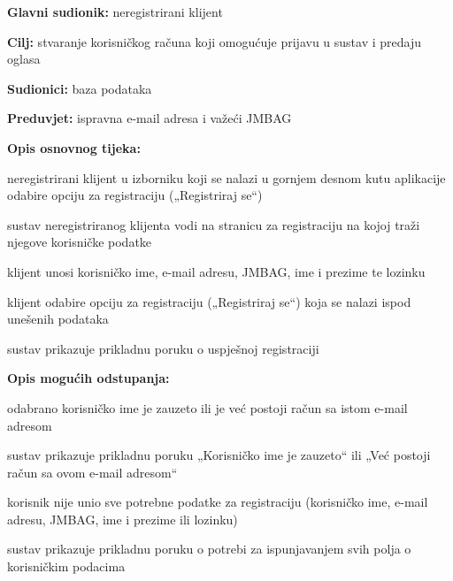 \noindent {}
\begin{packed_item}
	
	\item \textbf{Glavni sudionik: } neregistrirani klijent
	\item  \textbf{Cilj:} stvaranje korisničkog računa koji omogućuje prijavu u sustav i predaju oglasa
	\item  \textbf{Sudionici:} baza podataka
	\item  \textbf{Preduvjet:} ispravna e-mail adresa i važeći JMBAG
	\item  \textbf{Opis osnovnog tijeka:}
	
	\item[] \begin{packed_enum}
		
		\item neregistrirani klijent u izborniku koji se nalazi u gornjem desnom kutu aplikacije odabire opciju za registraciju („Registriraj se“)
		\item sustav neregistriranog klijenta vodi na stranicu za registraciju na kojoj traži njegove korisničke podatke
		\item klijent unosi korisničko ime, e-mail adresu, JMBAG, ime i prezime te lozinku
		\item klijent odabire opciju za registraciju („Registriraj se“) koja se nalazi ispod unešenih podataka
		\item sustav prikazuje prikladnu poruku o uspješnoj registraciji 
		
	\end{packed_enum}
	
	\item  \textbf{Opis mogućih odstupanja:}
	
	\item[] \begin{packed_item}
		
		\item[3.a] odabrano korisničko ime je zauzeto ili je već postoji račun sa istom e-mail adresom
		\item[] \begin{packed_enum}
			
			\item sustav prikazuje prikladnu poruku  „Korisničko ime je zauzeto“ ili „Već postoji račun sa ovom e-mail adresom“
			
		\end{packed_enum}
	
		\item[3.b] korisnik nije unio sve potrebne podatke za registraciju (korisničko ime, e-mail adresu, JMBAG, ime i prezime ili lozinku)
		\item[] \begin{packed_enum}
			
			\item sustav prikazuje prikladnu poruku o potrebi za ispunjavanjem svih polja o korisničkim podacima
			
		\end{packed_enum}
		
	\end{packed_item}
\end{packed_item}


